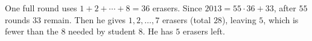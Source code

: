 One full round uses $1+2+\cdots+8=36$ erasers. Since $2013=55\cdot36+33$, after $55$ rounds $33$ remain. Then he gives $1,2,\dots,7$ erasers (total $28$), leaving $5$, which is fewer than the $8$ needed by student $8$. He has $\boxed{5}$ erasers left.
